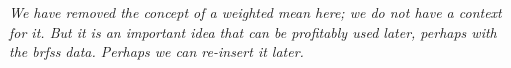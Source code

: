 \begin{doublespace}

\textit{We have removed the concept of a weighted mean here; we do not have a context for it.  But it is an important idea that can be profitably used later, perhaps with the brfss data.  Perhaps we can re-insert it later.}

\end{doublespace}
